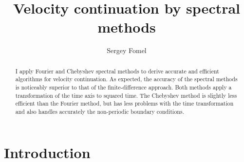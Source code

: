 \title{Velocity continuation by spectral methods}


\author{Sergey Fomel}

\maketitle

\begin{abstract}
I apply Fourier and Chebyshev spectral methods to derive accurate
  and efficient algorithms for velocity continuation.  As expected,
  the accuracy of the spectral methods is noticeably superior to that
  of the finite-difference approach. Both methods apply a
  transformation of the time axis to squared time. The Chebyshev
  method is slightly less efficient than the Fourier method, but has
  less problems with the time transformation and also handles
  accurately the non-periodic boundary conditions.
\end{abstract}

\section{Introduction}


